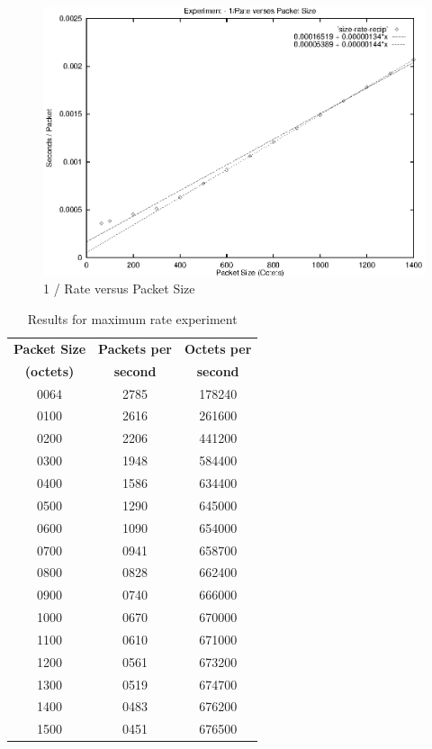 \begin{figure}
\leavevmode
\includegraphics{pics/size-rate-recip.eps}
\caption{1 / Rate versus Packet Size}
\label{trace:expr3}
\end{figure}

\begin{table}
\begin{center}
\begin{tabular}{ccc}
{\bfseries Packet Size} & {\bfseries Packets per} & {\bfseries Octets per} \\
{\bfseries (octets)} & {\bfseries second} & {\bfseries second} \\
0064	& 2785 & 178240 \\
0100	& 2616 & 261600 \\
0200	& 2206 & 441200 \\
0300	& 1948 & 584400 \\
0400	& 1586 & 634400 \\
0500	& 1290 & 645000 \\
0600	& 1090 & 654000 \\
0700	& 0941 & 658700 \\
0800	& 0828 & 662400 \\
0900	& 0740 & 666000 \\
1000	& 0670 & 670000 \\
1100	& 0610 & 671000 \\
1200	& 0561 & 673200 \\
1300	& 0519 & 674700 \\
1400	& 0483 & 676200 \\
1500	& 0451 & 676500 \\
\end{tabular}
\end{center}
\caption{Results for maximum rate experiment}
\label{trace:expr2}
\end{table}

